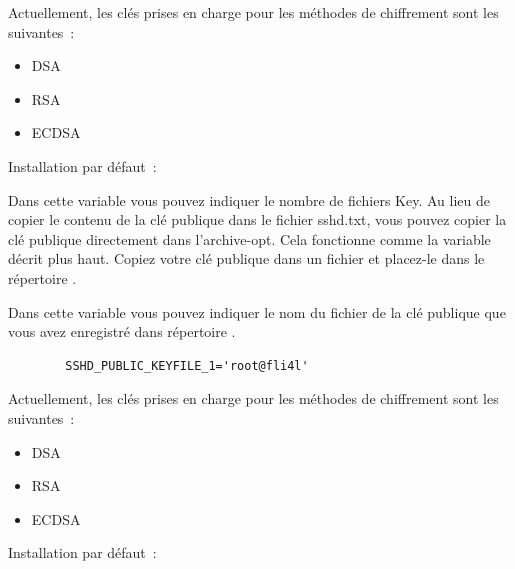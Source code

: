 \begin{description}

  Actuellement, les clés prises en charge pour les méthodes de chiffrement sont
  les suivantes~:
  \begin{itemize}
  \item DSA
  \item RSA
  \item ECDSA
  \end{itemize}


  Installation par défaut~: 

  Dans cette variable vous pouvez indiquer le nombre de fichiers Key. Au lieu de
  copier le contenu de la clé publique dans le fichier sshd.txt, vous pouvez
  copier la clé publique directement dans l'archive-opt. Cela fonctionne comme
  la variable  décrit plus haut. Copiez votre clé
  publique dans un fichier et placez-le dans le répertoire .


  Dans cette variable vous pouvez indiquer le nom du fichier de la clé publique
  que vous avez enregistré dans répertoire .

\begin{example}
\begin{verbatim}
        SSHD_PUBLIC_KEYFILE_1='root@fli4l'
\end{verbatim}
\end{example}

  Actuellement, les clés prises en charge pour les méthodes de chiffrement sont
  les suivantes~:
  \begin{itemize}
  \item DSA
  \item RSA
  \item ECDSA
  \end{itemize}


  Installation par défaut~: 


\end{description}
